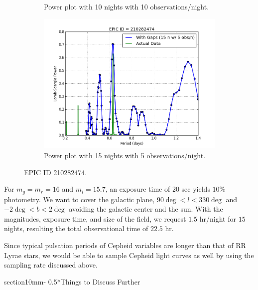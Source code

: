 \documentclass[letterpaper,11pt]{article}
\makeatletter
\renewcommand{\section}{\@startsection%
{section}{1}{0mm}{-\baselineskip}%
{0.5\baselineskip}{\normalfont\Large\bfseries}}%
\makeatother
\begin{document}
\begin{figure}[H]
\begin{subfigure}{.5\textwidth}
  \caption{Power plot with 10 nights with 10 observations/night.}
  \label{fig:1010}
  \end{subfigure}%
  \begin{subfigure}{.5\textwidth}
  \centering
  \includegraphics[width=.9\linewidth]{figures/1505Actual.png}
  \caption{Power plot with 15 nights with 5 observations/night.}
  \label{fig:1505}
\end{subfigure}
\caption{EPIC ID 210282474.}
\label{fig:EPIC}
\end{figure}


\noindent For $m_g = m_r = 16$ and $m_i = 15.7$, an exposure time of $20$ sec yields $10\%$ photometry. We want to cover the galactic plane, $90\deg < l <330\deg$ and $-2 \deg < b < 2 \deg$ avoiding the galactic center and the sun. With the magnitudes, exposure time, and size of the field, we request $1.5$ hr/night for $15$ nights, resulting the total observational time of $22.5$ hr.  


\vspace{3mm} %


\noindent Since typical pulsation periods of Cepheid variables are longer than that of RR Lyrae stars, we would be able to sample Cepheid light curves as well by using the sampling rate discussed above. 




\section*{Things to Discuss Further}
\end{document}
